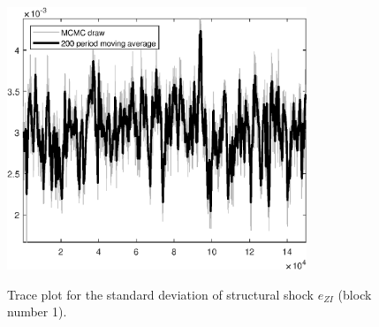 \begin{figure}[H]
\centering
  \includegraphics[width=0.8\textwidth]{BRS_gen/graphs/TracePlot_SE_e_ZI_blck_1}\\
    \caption{Trace plot for the standard deviation of structural shock ${e_{ZI}}$ (block number 1).}
\end{figure}
